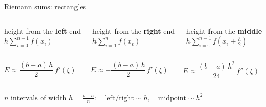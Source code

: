 \documentclass[aspectratio=169]{beamer}
\newcommand{\cbox}[2]{\colorbox{#1}{\ensuremath{\displaystyle #2}}}
\begin{document}
\begin{frame}{Riemann sums: rectangles}
\vspace{0.3em}
\footnotesize
\begin{columns}[T]
\begin{column}{0.31\textwidth}\centering
height from the \textbf{left} end\\[3pt]
$h\displaystyle\sum_{i=0}^{n-1} f(x_i)$
\end{column}
\begin{column}{0.31\textwidth}\centering
height from the \textbf{right} end\\[3pt]
$h\displaystyle\sum_{i=1}^{n} f(x_i)$
\end{column}
\begin{column}{0.31\textwidth}\centering
height from the \textbf{middle}\\[3pt]
$h\displaystyle\sum_{i=0}^{n-1} f\!\left(x_i + \tfrac{h}{2}\right)$
\end{column}
\end{columns}

\vspace{0.6em}
\begin{columns}[T]
\begin{column}{0.31\textwidth}\centering
$E \approx \dfrac{(b-a)\,h}{2}\, f'(\xi)$
\end{column}
\begin{column}{0.31\textwidth}\centering
$E \approx -\dfrac{(b-a)\,h}{2}\, f'(\xi)$
\end{column}
\begin{column}{0.31\textwidth}\centering
$E \approx \dfrac{(b-a)\,h^2}{24}\, f''(\xi)$
\end{column}
\end{columns}

\vspace{0.6em}
\centering
\cbox{accent!12}{n \text{ intervals of width } h = \tfrac{b-a}{n}: \quad \text{left/right} \sim h, \quad \text{midpoint} \sim h^2}
\end{frame}
\end{document}
